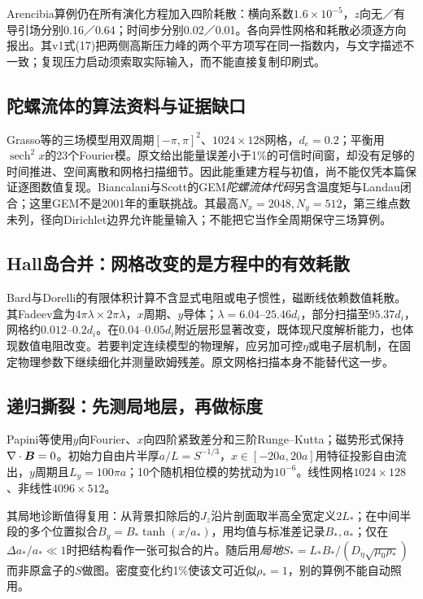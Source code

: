 Arencibia算例仍在所有演化方程加入四阶耗散：横向系数$1.6\times10^{-5}$，$z$向无／有导引场分别0.16／0.64；时间步分别0.02／0.01。各向异性网格和耗散必须逐方向报出。其v1式(17)把两侧高斯压力峰的两个平方项写在同一指数内，与文字描述不一致；复现压力启动须索取实际输入，而不能直接复制印刷式。

\subsection{陀螺流体的算法资料与证据缺口}
Grasso等的三场模型用双周期$[-\pi,\pi]^2$、$1024\times128$网格，$d_e=0.2$；平衡用$\operatorname{sech}^2x$的23个Fourier模。原文给出能量误差小于1\%的可信时间窗，却没有足够的时间推进、空间离散和网格扫描细节。因此能重建方程与初值，尚不能仅凭本篇保证逐图数值复现。Biancalani与Scott的GEM\emph{陀螺流体代码}另含温度矩与Landau闭合；这里GEM不是2001年的重联挑战。其最高$N_x=2048,N_y=512$，第三维点数未列，径向Dirichlet边界允许能量输入；不能把它当作全周期保守三场算例。\citep{E469,L184}

\subsection{Hall岛合并：网格改变的是方程中的有效耗散}
Bard与Dorelli的有限体积计算不含显式电阻或电子惯性，磁断线依赖数值耗散。其Fadeev盒为$4\pi\lambda\times2\pi\lambda$，$x$周期、$y$导体；$\lambda=6.04$--$25.46d_i$，部分扫描至$95.37d_i$，网格约$0.012$--$0.2d_i$。在$0.04$--$0.05d_i$附近层形显著改变，既体现尺度解析能力，也体现数值电阻改变。若要判定连续模型的物理解，应另加可控$\eta$或电子层机制，在固定物理参数下继续细化并测量欧姆残差。原文网格扫描本身不能替代这一步。\citep{L251}

\subsection{递归撕裂：先测局地层，再做标度}
Papini等使用$y$向Fourier、$x$向四阶紧致差分和三阶Runge--Kutta；磁势形式保持$\nabla\cdot\bm{B}=0$。初始力自由片半厚$a/L=S^{-1/3}$，$x\in[-20a,20a]$用特征投影自由流出，$y$周期且$L_y=100\pi a$；10个随机相位模的势扰动为$10^{-6}$。线性网格$1024\times128$、非线性$4096\times512$。

其局地诊断值得复用：从背景扣除后的$J_z$沿片剖面取半高全宽定义$2L_*$；在中间半段的多个位置拟合$B_y=B_*\tanh(x/a_*)$，用均值与标准差记录$B_*,a_*$；仅在$\Delta a_*/a_*\ll1$时把结构看作一张可拟合的片。随后用\emph{局地}$S_*=L_*B_*/(D_\eta\sqrt{\mu_0\rho_*})$而非原盒子的$S$做图。密度变化约1\%使该文可近似$\rho_*=1$，别的算例不能自动照用。\citep{L262}


